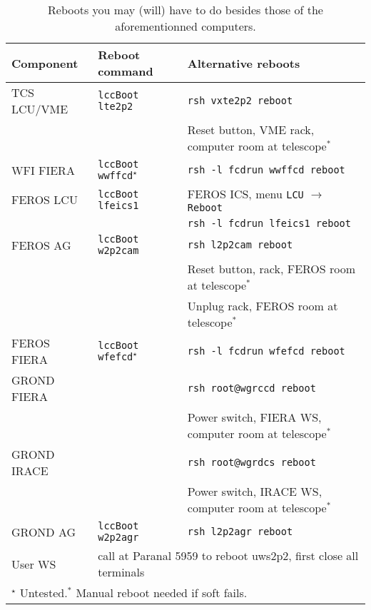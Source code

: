 \documentclass[11pt,fleqn]{book}
\begin{document}
\begin{table}
\caption[Some useful reboots]{Reboots you may (will) have to do besides those of the aforementionned computers.}
\label{tab:reboots}
\centering
\begin{tabular}{lll}
\hline
Component   & Reboot command                       & Alternative reboots\\
\hline\hline
TCS LCU/VME & \texttt{lccBoot lte2p2}              & \texttt{rsh vxte2p2 reboot}\\ 
            &                                      & Reset button, VME rack, computer room at telescope$^\ast$\\
\hline
WFI FIERA   & \texttt{lccBoot wwffcd}$^\star$      & \texttt{rsh -l fcdrun wwffcd reboot}\\
\hline
FEROS LCU   & \texttt{lccBoot lfeics1}             & FEROS ICS, menu \texttt{LCU} $\rightarrow$ \texttt{Reboot}\\
            &                                      & \texttt{rsh -l fcdrun lfeics1 reboot}\\
FEROS AG    & \texttt{lccBoot w2p2cam}             & \texttt{rsh l2p2cam reboot}\\
            &                                      & Reset button, rack, FEROS room at telescope$^\ast$\\
            &                                      & Unplug rack, FEROS room at telescope$^\ast$\\
FEROS FIERA & \texttt{lccBoot wfefcd}$^\star$      & \texttt{rsh -l fcdrun wfefcd reboot}\\
\hline
GROND FIERA &                                      & \texttt{rsh root@wgrccd reboot}\\
            &                                      & Power switch, FIERA WS, computer room at telescope$^\ast$\\
GROND IRACE &                                      & \texttt{rsh root@wgrdcs reboot}\\
            &                                      & Power switch, IRACE WS, computer room at telescope$^\ast$\\
GROND AG    & \texttt{lccBoot w2p2agr}             & \texttt{rsh l2p2agr reboot}\\
\hline
User WS     & \multicolumn{2}{l}{call at Paranal 5959 to reboot uws2p2, first close all terminals}\\
\hline
\multicolumn{3}{l}{$^\star$ Untested.\quad $^\ast$ Manual reboot needed if soft fails.}\\
\hline
\end{tabular}
\end{table}
\end{document}
